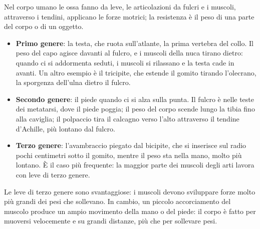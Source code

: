 Nel corpo umano le ossa fanno da leve, le articolazioni da fulcri e i muscoli, attraverso i tendini, applicano le forze motrici; la resistenza è il peso di una parte del corpo o di un oggetto.
\begin{itemize}
  \item \textbf{Primo genere}: la testa, che ruota sull'atlante, la prima vertebra del collo. Il peso del capo agisce davanti al fulcro, e i muscoli della nuca tirano dietro: quando ci si addormenta seduti, i muscoli si rilassano e la testa cade in avanti. Un altro esempio è il tricipite, che estende il gomito tirando l'olecrano, la sporgenza dell'ulna dietro il fulcro.
  \item \textbf{Secondo genere}: il piede quando ci si alza sulla punta. Il fulcro è nelle teste dei metatarsi, dove il piede poggia; il peso del corpo scende lungo la tibia fino alla caviglia; il polpaccio tira il calcagno verso l'alto attraverso il tendine d'Achille, più lontano dal fulcro.
  \item \textbf{Terzo genere}: l'avambraccio piegato dal bicipite, che si inserisce sul radio pochi centimetri sotto il gomito, mentre il peso sta nella mano, molto più lontano. È il caso più frequente: la maggior parte dei muscoli degli arti lavora con leve di terzo genere.
\end{itemize}
Le leve di terzo genere sono svantaggiose: i muscoli devono sviluppare forze molto più grandi dei pesi che sollevano. In cambio, un piccolo accorciamento del muscolo produce un ampio movimento della mano o del piede: il corpo è fatto per muoversi velocemente e su grandi distanze, più che per sollevare pesi.


